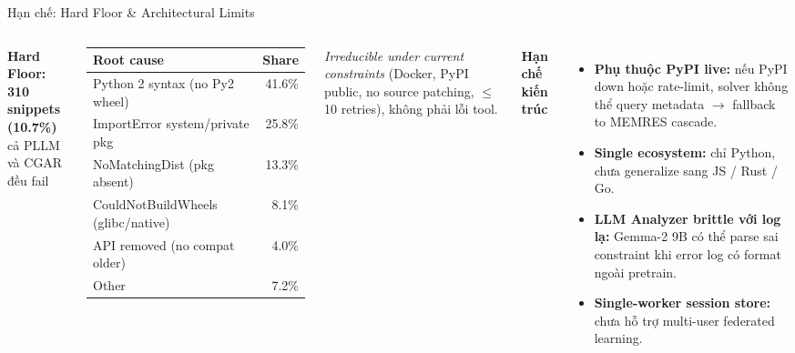 \documentclass[aspectratio=169,10pt]{beamer}
\begin{document}
\begin{frame}{Hạn chế: Hard Floor \& Architectural Limits}
\vspace{0.3em}
\begin{columns}[T,onlytextwidth]
\centering
\scriptsize
\textbf{Hard Floor: 310 snippets (10.7\%)}\\
{\tiny\color{gray}cả PLLM và CGAR đều fail}
\vspace{0.4em}

\setlength{\tabcolsep}{5pt}
\renewcommand{\arraystretch}{1.22}
\begin{tabular}{@{}l r@{}}
  \toprule
  \textbf{Root cause} & \textbf{Share} \\
  \midrule
  Python 2 syntax (no Py2 wheel)        & 41.6\% \\
  ImportError system/private pkg        & 25.8\% \\
  NoMatchingDist (pkg absent)           & 13.3\% \\
  CouldNotBuildWheels (glibc/native)    & 8.1\%  \\
  API removed (no compat older)         & 4.0\%  \\
  Other                                 & 7.2\%  \\
  \bottomrule
\end{tabular}

\vspace{0.5em}
\tiny\color{alert!85!black}
\textit{Irreducible under current constraints} (Docker, PyPI public, no source patching, $\le$10 retries), không phải lỗi tool.

\hspace{0.04\textwidth}
\scriptsize
\textbf{\color{navydeep}Hạn chế kiến trúc}
\vspace{0.4em}

\begin{itemize}\setlength{\itemsep}{0.5em}
  \item \textcolor{alert!80!black}{\textbf{Phụ thuộc PyPI live:}}
        nếu PyPI down hoặc rate-limit, solver không thể query metadata $\to$ fallback to MEMRES cascade.
  \item \textcolor{alert!80!black}{\textbf{Single ecosystem:}}
        chỉ Python, chưa generalize sang JS / Rust / Go.
  \item \textcolor{alert!80!black}{\textbf{LLM Analyzer brittle với log lạ:}}
        Gemma-2 9B có thể parse sai constraint khi error log có format ngoài pretrain.
  \item \textcolor{alert!80!black}{\textbf{Single-worker session store:}}
        chưa hỗ trợ multi-user federated learning.
\end{itemize}
\end{columns}
\end{frame}
\end{document}
